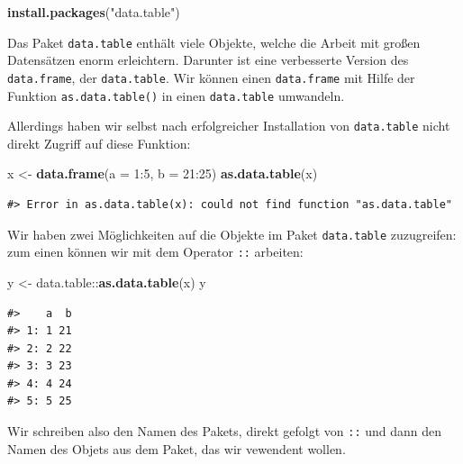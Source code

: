 \documentclass[]{tufte-book}
\newenvironment{Shaded}{}{}
\newcommand{\KeywordTok}[1]{\textcolor[rgb]{0.00,0.44,0.13}{\textbf{#1}}}
\newcommand{\DataTypeTok}[1]{\textcolor[rgb]{0.56,0.13,0.00}{#1}}
\newcommand{\DecValTok}[1]{\textcolor[rgb]{0.25,0.63,0.44}{#1}}
\newcommand{\StringTok}[1]{\textcolor[rgb]{0.25,0.44,0.63}{#1}}
\newcommand{\OperatorTok}[1]{\textcolor[rgb]{0.40,0.40,0.40}{#1}}
\newcommand{\NormalTok}[1]{#1}
\begin{document}
\begin{Shaded}
\begin{Highlighting}[]
\KeywordTok{install.packages}\NormalTok{(}\StringTok{"data.table"}\NormalTok{)}
\end{Highlighting}
\end{Shaded}

Das Paket \texttt{data.table} enthält viele Objekte, welche die Arbeit
mit großen Datensätzen enorm erleichtern. Darunter ist eine verbesserte
Version des \texttt{data.frame}, der \texttt{data.table}. Wir können
einen \texttt{data.frame} mit Hilfe der Funktion
\texttt{as.data.table()} in einen \texttt{data.table} umwandeln.

Allerdings haben wir selbst nach erfolgreicher Installation von
\texttt{data.table} nicht direkt Zugriff auf diese Funktion:

\begin{Shaded}
\begin{Highlighting}[]
\NormalTok{x <-}\StringTok{ }\KeywordTok{data.frame}\NormalTok{(}\DataTypeTok{a =} \DecValTok{1}\OperatorTok{:}\DecValTok{5}\NormalTok{, }\DataTypeTok{b =} \DecValTok{21}\OperatorTok{:}\DecValTok{25}\NormalTok{)}
\KeywordTok{as.data.table}\NormalTok{(x)}
\end{Highlighting}
\end{Shaded}

\begin{verbatim}
#> Error in as.data.table(x): could not find function "as.data.table"
\end{verbatim}

Wir haben zwei Möglichkeiten auf die Objekte im Paket
\texttt{data.table} zuzugreifen: zum einen können wir mit dem Operator
\texttt{::} arbeiten:

\begin{Shaded}
\begin{Highlighting}[]
\NormalTok{y <-}\StringTok{ }\NormalTok{data.table}\OperatorTok{::}\KeywordTok{as.data.table}\NormalTok{(x)}
\NormalTok{y}
\end{Highlighting}
\end{Shaded}

\begin{verbatim}
#>    a  b
#> 1: 1 21
#> 2: 2 22
#> 3: 3 23
#> 4: 4 24
#> 5: 5 25
\end{verbatim}

Wir schreiben also den Namen des Pakets, direkt gefolgt von \texttt{::}
und dann den Namen des Objets aus dem Paket, das wir vewendent wollen.
\end{document}
